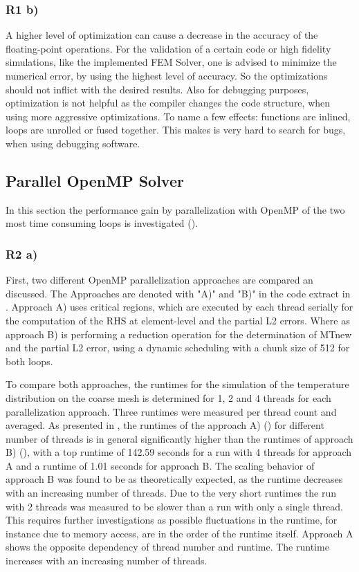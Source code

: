 \subsubsection{R1 b)}
A higher level of optimization can cause a decrease in the accuracy of the floating-point operations. For the validation of a certain code or high fidelity simulations, like the implemented FEM Solver, one is advised to minimize the numerical error, by using the highest level of accuracy. So the optimizations should not inflict with the desired results. Also for debugging purposes, optimization is not helpful as the compiler changes the code structure, when using more aggressive optimizations. To name a few effects: functions are inlined, loops are unrolled or fused together. This makes is very hard to search for bugs, when using debugging software.

\clearpage
\subsection{Parallel OpenMP Solver}

In this section the performance gain by parallelization with OpenMP of the two most time consuming loops is investigated ().  

\subsubsection{R2 a) \label{sec:OpenMPAB}}

First, two different OpenMP parallelization approaches are compared an discussed. The Approaches are denoted with "A)" and "B)" in the code extract in . Approach A) uses critical regions, which are executed by each thread serially for the computation of the RHS at element-level and the partial L2 errors. Where as approach B) is performing a reduction operation for the determination of MTnew and the partial L2 error, using a dynamic scheduling with a chunk size of 512 for both loops. 

To compare both approaches, the runtimes for the simulation of the temperature distribution on the coarse mesh is determined for 1, 2 and 4 threads for each parallelization approach. Three runtimes were measured per thread count and averaged. 
As presented in , the runtimes of the approach A) () for different number of threads is in general significantly higher than the runtimes of approach B) (), with a top runtime of 142.59 seconds for a run with 4 threads for approach A and a runtime of 1.01 seconds for approach B. The scaling behavior of approach B was found to be as theoretically expected, as the runtime decreases with an increasing number of threads. Due to the very short runtimes the run with 2 threads was measured to be slower than a run with only a single thread. This requires further investigations as possible fluctuations in the runtime, for instance due to memory access, are in the order of the runtime itself. Approach A shows the opposite dependency of thread number and runtime. The runtime increases with an increasing number of threads. 

